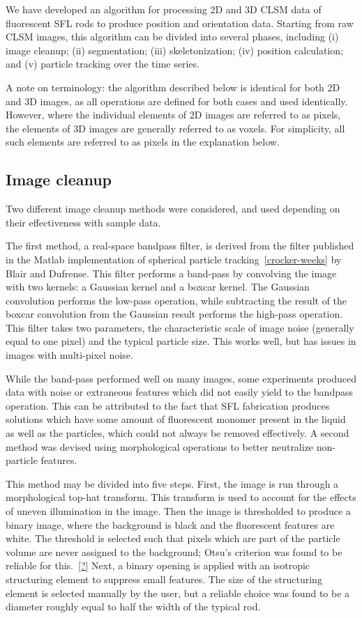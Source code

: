 We have developed an algorithm for processing 2D and 3D CLSM data of fluorescent SFL rods to
produce position and orientation data.  Starting from raw CLSM images, this algorithm can be divided
into several phases, including (i) image cleanup; (ii) segmentation; (iii) skeletonization;
(iv) position calculation; and
(v) particle tracking over the time series.  

A note on terminology: the algorithm described below is identical for both 2D and 3D images, as all
operations are defined for both cases and used identically. However, where the individual elements of
2D images are referred to as pixels, the elements of 3D images are generally referred to as voxels.
For simplicity, all such elements are referred to as pixels in the explanation below.

\subsection{Image cleanup}

Two different image cleanup methods were considered, and used depending on their effectiveness with
sample data.

The first method, a real-space bandpass filter, is derived from the filter published in the 
Matlab implementation of spherical particle tracking~\ref{crocker-weeks} by Blair and
Dufrense. This filter performs a band-pass by convolving the image with two kernels: 
a Gaussian kernel and a boxcar kernel.  The Gaussian convolution performs the low-pass
operation, while subtracting the result of the boxcar convolution from the Gaussian result
performs the high-pass operation. This filter takes two parameters, the characteristic scale
of image noise (generally equal to one pixel) and the typical particle size.  This works well,
but has issues in images with multi-pixel noise.

While the band-pass performed well on many images, some experiments produced data with noise or
extraneous features which did
not easily yield to the bandpass operation. This can be attributed to the fact that SFL fabrication produces
solutions which have some amount of fluorescent monomer present in the liquid as well as the particles, which
could not always be removed effectively.  A second method was devised using morphological
operations to better neutralize non-particle features.

This method may be divided into five steps. First, the 
image is run through a morphological top-hat transform. This transform is used to account for the effects of
uneven illumination in the image. Then the image is thresholded to produce a binary image, where the 
background is black and the fluorescent features are white. The threshold is selected such that pixels which 
are part of the particle volume are never assigned to the background; Otsu's criterion was found to be reliable
for this.~\ref{?}  Next, a binary opening is applied with an isotropic structuring element to
suppress small features. The size of the structuring element is selected manually by the user, but a 
reliable choice was found to be a diameter roughly equal to half the width of the typical rod. 

